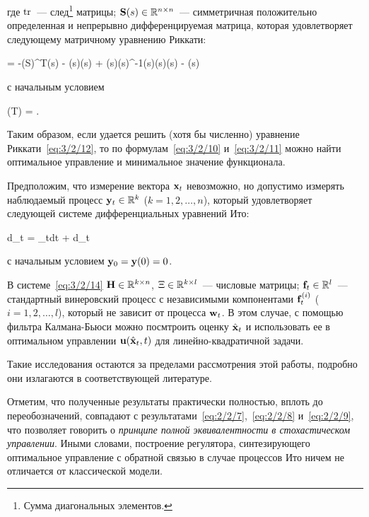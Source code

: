 где $\operatorname{\mathrm{tr}}$~--- след\footnote{ Сумма диагональных элементов. } матрицы; $\mathbf{S}(s) \in \mathbb{R}^{{n} \times {n}}$~--- симметричная положительно определенная и непрерывно дифференцируемая матрица, которая удовлетворяет следующему матричному уравнению Риккати:

	 = -(S)^T(s) - (s)(s) + (s)(s)^{-1}(s)(s)(s) - (s)
\eeq

с начальным условием

	(T) =  \mbox{.}
\eeq

Таким образом, если удается решить (хотя бы численно) уравнение Риккати~\ref{eq:3/2/12}, то по формулам~\ref{eq:3/2/10} и~\ref{eq:3/2/11} можно найти оптимальное управление и минимальное значение функционала.

\br

Предположим, что измерение вектора $\mathbf{x}_t$ невозможно, но допустимо измерять наблюдаемый процесс $\mathbf{y}_t \in \mathbb{R}^{k}$ ($k = 1, 2, \ldots, n$), который удовлетворяет следующей системе дифференциальных уравнений Ито:

	d_t = _tdt + \Xi d_t
\eeq

с начальным условием $\mathbf{y}_0 = \mathbf{y}(0) = 0$.

В системе~\ref{eq:3/2/14} $\mathbf{H} \in \mathbb{R}^{{k} \times {n}}$, $\Xi \in \mathbb{R}^{{k} \times {l}}$~--- числовые матрицы; $\mathbf{f}_t \in \mathbb{R}^{l}$~--- стандартный винеровский процесс с независимыми компонентами $\mathbf{f}^{(i)}_t$ ($i = 1, 2, \ldots, l$), который не зависит от процесса $\mathbf{w}_t$. В этом случае, с помощью фильтра Калмана-Бьюси можно посмтроить оценку $\hat{\mathbf{x}}_t$ и использовать ее в оптимальном управлении $\mathbf{u}(\hat{\mathbf{x}}_t, t)$ для линейно-квадратичной задачи.

Такие исследования остаются за пределами рассмотрения этой работы, подробно они излагаются в соответствующей литературе\cite{KLOEDEN}.

\br

Отметим, что полученные результаты практически полностью, вплоть до переобозначений, совпадают с результатами~\ref{eq:2/2/7},~\ref{eq:2/2/8} и~\vref{eq:2/2/9}, что позволяет говорить о \emph{принципе полной эквивалентности в стохастическом управлении}. Иными словами, построение регулятора, синтезирующего оптимальное управление с обратной связью в случае процессов Ито ничем не отличается от классической модели.



